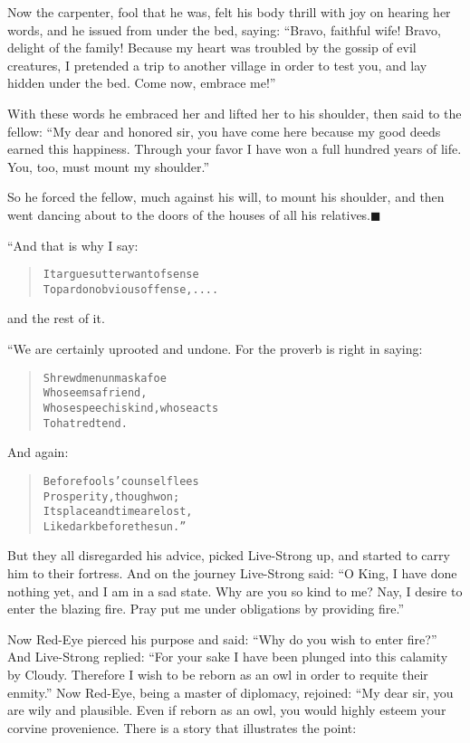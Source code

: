 \documentclass[article, twoside, 14pt]{memoir}
\newcommand{\qed}{\hfill \ensuremath{\blacksquare}}
\renewenvironment{verbatim}{%
\begin{quote}%
\vskip -10pt%
\begin{alltt}\normalfont\large}{\end{alltt}%
\end{quote}%
\vskip -10pt
} %
\begin{document}
Now the carpenter, fool that he was, felt his body thrill with joy
on hearing her words, and he issued from under the bed, saying:
``Bravo, faithful wife! Bravo, delight of the family! Because my heart was troubled by the gossip of evil creatures, I pretended a trip to another village in order to test you, and lay hidden under the bed. Come now, embrace me!''

With these words he embraced her and lifted her to his shoulder,
then said to the fellow:
``My dear and honored sir, you have come here because my good deeds earned this happiness. Through your favor I have won a full hundred years of life. You, too, must mount my shoulder.''

So he forced the fellow, much against his will, to mount his
shoulder, and then went dancing about to the doors of the houses of
all his relatives.\hyperref[s59]{\qed}

“And that is why I say:

\begin{verbatim}
It argues utter want of sense
To pardon obvious offense, . . . .
\end{verbatim}
and the rest of it.

“We are certainly uprooted and undone. For the proverb is right in
saying:

\begin{verbatim}
Shrewd men unmask a foe
    Who seems a friend,
Whose speech is kind, whose acts
    To hatred tend.
\end{verbatim}
And again:

\begin{verbatim}
Before fools' counsel flees
    Prosperity, though won;
Its place and time are lost,
    Like dark before the sun.”
\end{verbatim}
But they all disregarded his advice, picked Live-Strong up, and
started to carry him to their fortress. And on the journey
Live-Strong said:
``O King, I have done nothing yet, and I am in a sad state. Why are you so kind to me? Nay, I desire to enter the blazing fire. Pray put me under obligations by providing fire.''

Now Red-Eye pierced his purpose and said:
``Why do you wish to enter fire?'' And Live-Strong replied:
``For your sake I have been plunged into this calamity by Cloudy. Therefore I wish to be reborn as an owl in order to requite their enmity.''
Now Red-Eye, being a master of diplomacy, rejoined: “My dear sir,
you are wily and plausible. Even if reborn as an owl, you would
highly esteem your corvine provenience. There is a story that
illustrates the point:
\end{document}
